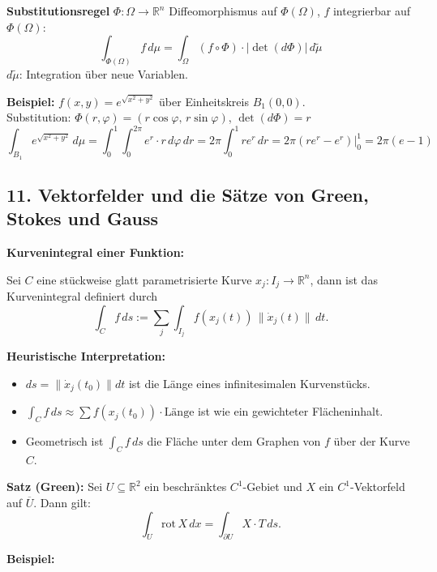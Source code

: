 \vspace{0.5em}
\textbf{Substitutionsregel}
\( \Phi : \Omega \to \mathbb{R}^n \) Diffeomorphismus auf \( \Phi(\Omega) \), \( f \) integrierbar auf \( \Phi(\Omega) \):
\[
\int_{\Phi(\Omega)} f\,d\mu =
\int_\Omega (f \circ \Phi) \cdot |\det(d\Phi)|\,d\tilde{\mu}
\]
\( d\tilde{\mu} \): Integration über neue Variablen.

\vspace{0.5em}
\textbf{Beispiel:} \( f(x,y) = e^{\sqrt{x^2 + y^2}} \) über Einheitskreis \( B_1(0,0) \). \\
Substitution: \( \Phi(r,\varphi) = (r\cos\varphi,\, r\sin\varphi) \), \( \det(d\Phi) = r \)
\[
\int_{B_1} e^{\sqrt{x^2+y^2}}\,d\mu
= \int_0^1 \int_0^{2\pi} e^r \cdot r\,d\varphi\,dr
= 2\pi \int_0^1 r e^r\,dr
= 2\pi \left( re^r - e^r \right)\big|_0^1 = 2\pi(e - 1)
\]

\subsection{11. Vektorfelder und die 
Sätze von Green, Stokes und Gauss}

\textbf{Kurvenintegral einer Funktion:}

Sei $C$ eine stückweise glatt parametrisierte Kurve $x_j : I_j \to \mathbb{R}^n$, dann ist das Kurvenintegral definiert durch
\[
\int_C f \, ds := \sum_j \int_{I_j} f(x_j(t)) \, \lVert \dot{x}_j(t) \rVert \, dt.
\]

\textbf{Heuristische Interpretation:}

\begin{itemize}
  \item $ds = \lVert \dot{x}_j(t_0) \rVert dt$ ist die Länge eines infinitesimalen Kurvenstücks.
  \item $\int_C f \, ds \approx \sum f(x_j(t_0)) \cdot \text{Länge}$ ist wie ein gewichteter Flächeninhalt.
  \item Geometrisch ist $\int_C f \, ds$ die Fläche unter dem Graphen von $f$ über der Kurve $C$.
\end{itemize}

\textbf{Satz (Green):}
Sei $U \subseteq \mathbb{R}^2$ ein beschränktes $C^1$-Gebiet und $X$ ein $C^1$-Vektorfeld auf $\overline{U}$. Dann gilt:
\[
\int_U \mathrm{rot}\, X \, dx = \int_{\partial U} X \cdot T \, ds.
\]

\textbf{Beispiel:}

